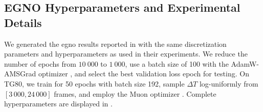 \subsection{EGNO Hyperparameters and Experimental Details}
\label{appx:egno_hyperparams}
We generated the \gls{egno} results reported in  with the same discretization parameters and hyperparameters as used in their experiments. We reduce the number of epochs from \(10\ 000\) to \(1\ 000\), use a batch size of 100 with the AdamW-AMSGrad optimizer \cite{loshchilov_decoupled_2017}, and select the best validation loss epoch for testing. On TG80, we train for 50 epochs with batch size 192, sample \(\Delta T\) log-uniformly from \([3\,000, 24\,000]\) frames, and employ the Muon optimizer \cite{jordan_muon_2024, kim_pytorch_optimizer_2021}. Complete hyperparameters are displayed in .

